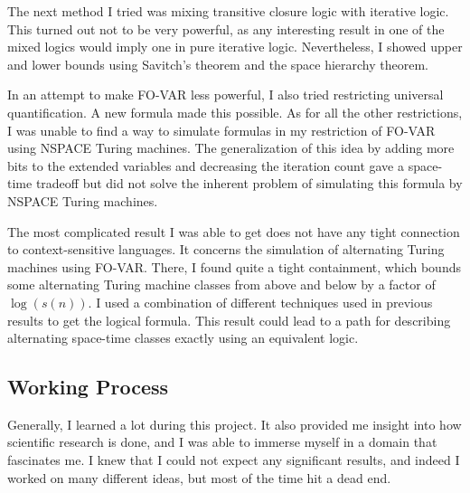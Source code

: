 The next method I tried was mixing transitive closure logic with iterative logic.
This turned out not to be very powerful, as any interesting result in one of the mixed logics would imply one in pure iterative logic.
Nevertheless, I showed upper and lower bounds using Savitch's theorem and the space hierarchy theorem.

In an attempt to make \acs{FO-VAR} less powerful, I also tried restricting universal quantification.
A new formula made this possible.
As for all the other restrictions, I was unable to find a way to simulate formulas in my restriction of \acs{FO-VAR} using \acs{NSPACE} Turing machines.
The generalization of this idea by adding more bits to the extended variables and decreasing the iteration count gave a space-time tradeoff but did not solve the inherent problem of simulating this formula by \acs{NSPACE} Turing machines.

The most complicated result I was able to get does not have any tight connection to context-sensitive languages.
It concerns the simulation of alternating Turing machines using \acs{FO-VAR}\@.
There, I found quite a tight containment, which bounds some alternating Turing machine classes from above and below by a factor of $\log(s(n))$.
I used a combination of different techniques used in previous results to get the logical formula.
This result could lead to a path for describing alternating space-time classes exactly using an equivalent logic.

\subsection{Working Process}\label{subsec:working-process}
Generally, I learned a lot during this project.
It also provided me insight into how scientific research is done, and I was able to immerse myself in a domain that fascinates me.
I knew that I could not expect any significant results, and indeed I worked on many different ideas, but most of the time hit a dead end.

